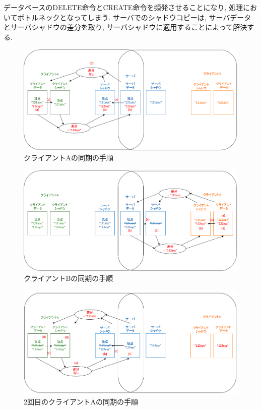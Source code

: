 データベースのDELETE命令とCREATE命令を頻発させることになり, 処理においてボトルネックとなってしまう. サーバでのシャドウコピーは, サーバデータとサーバシャドウの差分を取り, サーバシャドウに適用することによって解決する.
\begin{figure}[htbp]
  \begin{center}
    \includegraphics[scale=0.45]{images/sycle1}
    \caption{クライアントAの同期の手順}
    \label{sycle1}
  \end{center}
\end{figure}
\begin{figure}[htbp]
  \begin{center}
    \includegraphics[scale=0.45]{images/sycle2}
    \caption{クライアントBの同期の手順}
    \label{sycle2}
  \end{center}
\end{figure}
\begin{figure}[htbp]
  \begin{center}
    \includegraphics[scale=0.5]{images/sycle3}
    \caption{2回目のクライアントAの同期の手順}
    \label{sycle3}
  \end{center}
\end{figure}
